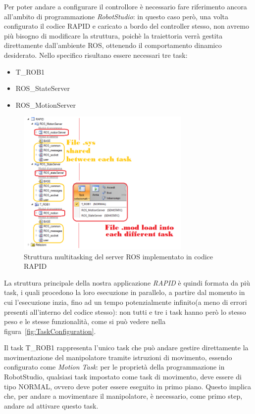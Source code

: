 Per poter andare a configurare il controllore è necessario fare riferimento ancora all'ambito di programmazione \emph{RobotStudio}: in questo caso però, una volta configurato il codice RAPID e caricato a bordo del controller stesso, non avremo più bisogno di modificare la struttura, poichè la traiettoria verrà gestita direttamente dall'ambiente ROS, ottenendo il comportamento dinamico desiderato.
Nello specifico risultano essere necessari tre task: 
\begin{itemize}
	\item T\_ROB1
	\item ROS\_StateServer
	\item ROS\_MotionServer
\end{itemize}
\begin{figure}
	\centering
	\includegraphics[width=0.75\textwidth]{Immagini/ParallelTask_VirtualController}
	\caption{Struttura multitasking del server ROS implementato in codice RAPID}
	\label{fig:ParallelTask}
\end{figure}

La struttura principale della nostra applicazione \emph{RAPID} è quindi formata da più task, i quali procedono la loro esecuzione in parallelo, a partire dal momento in cui l'esecuzione inzia, fino ad un tempo potenzialmente infinito(a meno di errori presenti all'interno del codice stesso): non tutti e tre i task hanno però lo stesso peso e le stesse funzionalità, come si può vedere nella figura~\vref{fig:TaskConfiguration}. 
\label{text:TROB1}

Il task T\_ROB1 rappresenta l'unico task che può andare gestire direttamente la movimentazione del manipolatore tramite istruzioni di movimento, essendo configurato come \emph{Motion Task}: per le proprietà della programmazione in RobotStudio, qualsiasi task impostato come task di movimento, deve essere di tipo NORMAL, ovvero deve poter essere eseguito in primo piano. Questo implica che, per andare a movimentare il manipolatore, è necessario, come primo step, andare ad attivare questo task.

